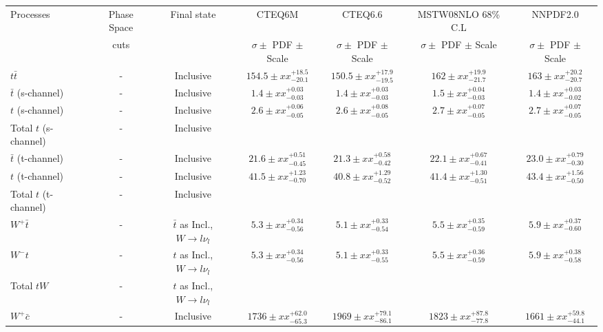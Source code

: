 \vspace{3mm}
\begin{table}[hbt]
\begin{center}
\renewcommand{\arraystretch}{1.2}
 {\footnotesize
\begin{tabular}{|l|c|c|c|c|c|c|}\hline
Processes & Phase Space & Final state & CTEQ6M  & CTEQ6.6 & MSTW08NLO 68\% C.L & NNPDF2.0  \\ 
 & cuts & & $\sigma \pm$ PDF $\pm$ Scale & $\sigma \pm$ PDF $\pm$ Scale & $ \sigma \pm$ PDF $\pm$ Scale &  $\sigma \pm$ PDF $\pm$ Scale \\ \hline
$t\bar{t}$ & - & Inclusive & $154.5 \pm xx ^{+18.5}_{-20.1}$ & $150.5 \pm xx ^{+17.9}_{-19.5}$ & $162 \pm xx ^{+19.9}_{-21.7}$ & $163 \pm xx ^{+20.2}_{-20.7}$  \\ \hline
$\bar{t}$ (s-channel) & - & Inclusive & $1.4 \pm xx ^{+0.03}_{-0.03}$ & $1.4 \pm xx ^{+0.03}_{-0.03}$ & $1.5 \pm xx ^{+0.04}_{-0.03}$ & $1.4 \pm xx ^{+0.03}_{-0.02}$ \\ \hline
$t$ (s-channel) & - & Inclusive & $2.6 \pm xx ^{+0.06}_{-0.05}$ & $2.6 \pm xx ^{+0.08}_{-0.05}$ & $2.7 \pm xx ^{+0.07}_{-0.05}$ & $2.7 \pm xx ^{+0.07}_{-0.05}$ \\ \hline
Total $t$ (s-channel) & - & Inclusive & & & & \\ \hline
$\bar{t}$ (t-channel) & - & Inclusive & $21.6 \pm xx ^{+0.51}_{-0.45}$ & $21.3 \pm xx ^{+0.58}_{-0.42}$ & $22.1 \pm xx ^{+0.67}_{-0.41}$ & $23.0 \pm xx ^{+0.79}_{-0.30}$  \\ \hline
$t$ (t-channel) & - & Inclusive & $41.5 \pm xx ^{+1.23}_{-0.70}$ & $40.8 \pm xx ^{+1.29}_{-0.52}$ & $41.4 \pm xx ^{+1.30}_{-0.51}$ & $43.4 \pm xx ^{+1.56}_{-0.50}$  \\ \hline
Total $t$ (t-channel) & - & Inclusive & & & & \\ \hline
$W^+ \bar{t}$ & - & $\bar{t}$ as Incl., $W\rightarrow l \nu_l$ & $5.3 \pm xx ^{+0.34}_{-0.56}$ & $5.1 \pm xx ^{+0.33}_{-0.54}$ & $5.5 \pm xx ^{+0.35}_{-0.59}$ & $5.9 \pm xx ^{+0.37}_{-0.60}$ \\ \hline
$W^- t$ & - & $t$ as Incl., $W\rightarrow l \nu_l$ & $5.3 \pm xx ^{+0.34}_{-0.56}$ & $5.1 \pm xx ^{+0.33}_{-0.55}$ & $5.5 \pm xx ^{+0.36}_{-0.59}$ & $5.9 \pm xx ^{+0.38}_{-0.58}$ \\ \hline
Total $tW$ & - & $t$ as Incl., $W\rightarrow l \nu_l$ & & & & \\ \hline
$W^+ \bar{c}$ & - & Inclusive & $1736 \pm xx ^{+62.0}_{-65.3}$ & $1969 \pm xx ^{+79.1}_{-86.1}$ & $1823 \pm xx ^{+87.8}_{-77.8}$ & $1661 \pm xx ^{+59.8}_{-44.1}$ \\ \hline

\end{tabular}}
\end{center}
\end{table}
